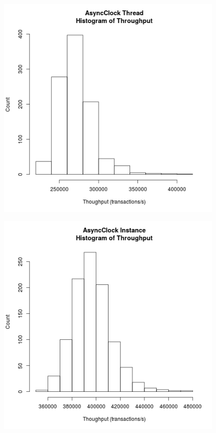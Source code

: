 \clearpage
\begin{figure}
\center
\includegraphics[height=.25\textheight]{async_thread_throughput_hist.png}
\caption{\label{async_thread_throughput}}
\end{figure}

\begin{figure}
\center
\includegraphics[height=.25\textheight]{async_instance_throughput_hist.png}
\caption{\label{async_instance_throughput}}
\end{figure}


